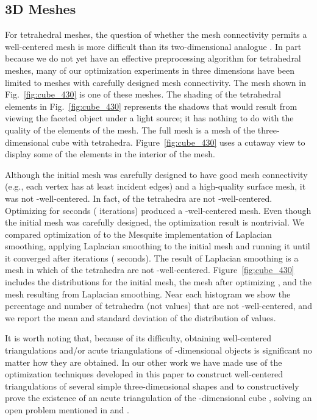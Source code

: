 \documentclass[final]{siamltex}
\begin{document}
\subsection{3D Meshes} \label{subsec:3dresult}

For tetrahedral meshes, the question of whether the mesh connectivity
permits a well-centered mesh is more difficult than its
two-dimensional analogue \cite{VaHiGuRaZh2008}. In part because we do
not yet have an effective preprocessing algorithm for tetrahedral
meshes, many of our optimization experiments in three dimensions have
been limited to meshes with carefully designed mesh connectivity.
The mesh shown in Fig.~\ref{fig:cube_430} is one of these meshes.
The shading of the tetrahedral elements in Fig.~\ref{fig:cube_430}
represents the shadows that would result from viewing
the faceted object under a light source; it has nothing
to do with the quality of the elements of the mesh.  The full
mesh is a mesh of the three-dimensional cube with  tetrahedra.
Figure~\ref{fig:cube_430} uses a cutaway view to display some
of the elements in the interior of the mesh.



Although the initial mesh was carefully designed to have good
mesh connectivity (e.g., each vertex has at least  incident
edges) and a high-quality surface mesh, it was not -well-centered.
In fact,  of the tetrahedra are not -well-centered.
Optimizing  for  seconds ( iterations) produced
a -well-centered mesh.  Even though the initial mesh was carefully
designed, the optimization result is nontrivial.  We compared
optimization of  to the Mesquite implementation of Laplacian
smoothing, applying Laplacian smoothing to the initial mesh and
running it until it converged after  iterations
( seconds).  The result of Laplacian
smoothing is a mesh in which  of the tetrahedra are not
-well-centered.  Figure~\ref{fig:cube_430} includes
the  distributions for the initial mesh,
the mesh after optimizing , and the mesh resulting from
Laplacian smoothing.  Near each histogram we show the percentage 
and number  of tetrahedra (not  values) that are not
-well-centered, and we report the mean  and standard
deviation  of the distribution of  values.

It is worth noting that, because of its
difficulty, obtaining well-centered
triangulations and/or acute triangulations of -dimensional
objects is significant no matter how they are obtained.
In our other work we have made use of the optimization
techniques developed in this paper to
construct well-centered triangulations of several
simple three-dimensional shapes \cite{VaHiGu2008} and to
constructively prove the existence of an acute triangulation
of the -dimensional cube \cite{VaHiZhGu2009}, solving
an open problem mentioned in \cite{EpSuUn2004} and
\cite{BrKoKrSo2009}.
\end{document}
